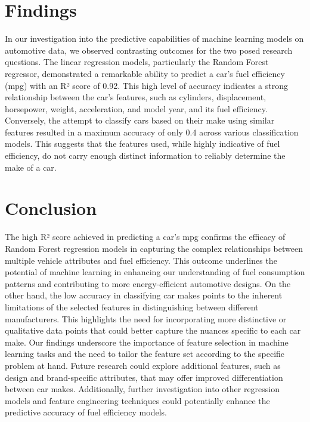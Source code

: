 \documentclass[a4paper, twocolumn]{article}
\begin{document}
\section{Findings\label{sec:Findings}}
In our investigation into the predictive capabilities of machine learning models on automotive data, we observed contrasting outcomes for the two posed research questions. The linear regression models, particularly the Random Forest regressor, demonstrated a remarkable ability to predict a car's fuel efficiency (mpg) with an R² score of 0.92. This high level of accuracy indicates a strong relationship between the car's features, such as cylinders, displacement, horsepower, weight, acceleration, and model year, and its fuel efficiency.
Conversely, the attempt to classify cars based on their make using similar features resulted in a maximum accuracy of only 0.4 across various classification models. This suggests that the features used, while highly indicative of fuel efficiency, do not carry enough distinct information to reliably determine the make of a car.

\section{Conclusion\label{sec:Conclusion}}

The high R² score achieved in predicting a car's mpg confirms the efficacy of Random Forest regression models in capturing the complex relationships between multiple vehicle attributes and fuel efficiency. This outcome underlines the potential of machine learning in enhancing our understanding of fuel consumption patterns and contributing to more energy-efficient automotive designs.
On the other hand, the low accuracy in classifying car makes points to the inherent limitations of the selected features in distinguishing between different manufacturers. This highlights the need for incorporating more distinctive or qualitative data points that could better capture the nuances specific to each car make.
Our findings underscore the importance of feature selection in machine learning tasks and the need to tailor the feature set according to the specific problem at hand. Future research could explore additional features, such as design and brand-specific attributes, that may offer improved differentiation between car makes. Additionally, further investigation into other regression models and feature engineering techniques could potentially enhance the predictive accuracy of fuel efficiency models.

\end{document}
